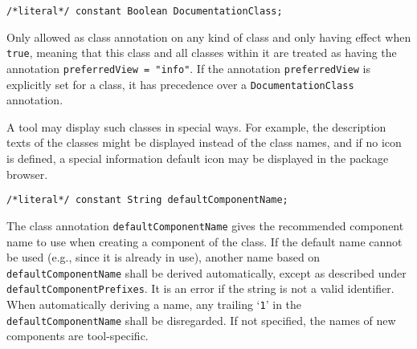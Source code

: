 \begin{annotationdefinition}[DocumentationClass]
\begin{synopsis}\begin{lstlisting}
/*literal*/ constant Boolean DocumentationClass;
\end{lstlisting}\end{synopsis}
\begin{semantics}
Only allowed as class annotation on any kind of class and only having effect when \lstinline!true!, meaning that this class and all classes within it are treated as having the annotation \lstinline!preferredView = "info"!.
If the annotation \lstinline!preferredView! is explicitly set for a class, it has precedence over a \lstinline!DocumentationClass! annotation.

\begin{nonnormative}
A tool may display such classes in special ways.
For example, the description texts of the classes might be displayed instead of the class names, and if no icon is defined, a special information default icon may be displayed in the package browser.
\end{nonnormative}
\end{semantics}
\end{annotationdefinition}

\begin{annotationdefinition}[defaultComponentName]
\begin{synopsis}\begin{lstlisting}
/*literal*/ constant String defaultComponentName;
\end{lstlisting}\end{synopsis}
\begin{semantics}
The class annotation \lstinline!defaultComponentName! gives the recommended component name to use when creating a component of the class.
If the default name cannot be used (e.g., since it is already in use), another name based on \lstinline!defaultComponentName! shall be derived automatically, except as described under \lstinline!defaultComponentPrefixes!.
It is an error if the string is not a valid identifier.
When automatically deriving a name, any trailing `\lstinline!1!' in the \lstinline!defaultComponentName! shall be disregarded.
If not specified, the names of new components are tool-specific.
\end{semantics}
\end{annotationdefinition}

